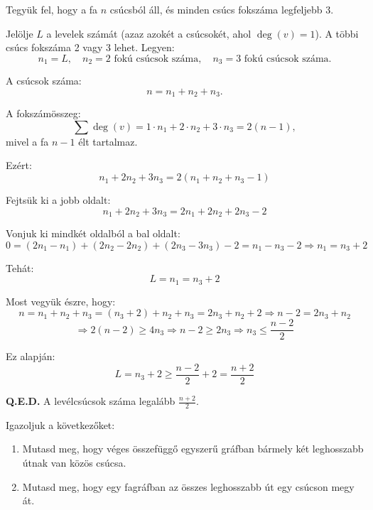 \begin{solution}
	\noindent Tegyük fel, hogy a fa $n$ csúcsból áll, és minden csúcs
	fokszáma legfeljebb 3.
	
	Jelölje $L$ a levelek számát (azaz azokét a csúcsokét, ahol $\deg(v)=1$).
	A többi csúcs fokszáma 2 vagy 3 lehet. Legyen: 
	\[
	n_{1}=L,\quad n_{2}=\text{2 fokú csúcsok száma},\quad n_{3}=\text{3 fokú csúcsok száma}.
	\]
	
	A csúcsok száma: 
	\[
	n=n_{1}+n_{2}+n_{3}.
	\]
	
	A fokszámösszeg: 
	\[
	\sum\deg(v)=1\cdot n_{1}+2\cdot n_{2}+3\cdot n_{3}=2(n-1),
	\]
	mivel a fa $n-1$ élt tartalmaz.
	
	Ezért: 
	\[
	n_{1}+2n_{2}+3n_{3}=2(n_{1}+n_{2}+n_{3}-1)
	\]
	
	Fejtsük ki a jobb oldalt: 
	\[
	n_{1}+2n_{2}+3n_{3}=2n_{1}+2n_{2}+2n_{3}-2
	\]
	
	Vonjuk ki mindkét oldalból a bal oldalt: 
	\[
	0=(2n_{1}-n_{1})+(2n_{2}-2n_{2})+(2n_{3}-3n_{3})-2=n_{1}-n_{3}-2\Rightarrow n_{1}=n_{3}+2
	\]
	
	Tehát: 
	\[
	L=n_{1}=n_{3}+2
	\]
	
	Most vegyük észre, hogy: 
	\[
	n=n_{1}+n_{2}+n_{3}=(n_{3}+2)+n_{2}+n_{3}=2n_{3}+n_{2}+2\Rightarrow n-2=2n_{3}+n_{2}
	\]
	\[
	\Rightarrow2(n-2)\ge4n_{3}\Rightarrow n-2\ge2n_{3}\Rightarrow n_{3}\le\frac{n-2}{2}
	\]
	
	Ez alapján: 
	\[
	L=n_{3}+2\ge\frac{n-2}{2}+2=\frac{n+2}{2}
	\]
	
	\textbf{Q.E.D.} A levélcsúcsok száma legalább $\boxed{\frac{n+2}{2}}$. 
\end{solution}
\begin{extraproblem}
	Igazoljuk a következőket: 
	\begin{enumerate}
		\item Mutasd meg, hogy véges összefüggő egyszerű gráfban bármely két leghosszabb
		útnak van közös csúcsa. 
		\item Mutasd meg, hogy egy fagráfban az összes leghosszabb út egy csúcson
		megy át. 
	\end{enumerate}
\end{extraproblem}

